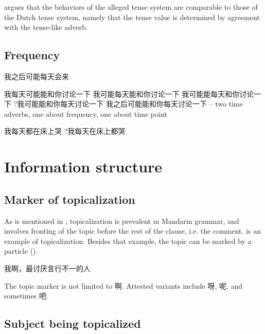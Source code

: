 \documentclass[UTF8, a4paper, oneside, scheme=plain, 12pt]{ctexrep}
\begin{document}
\citet{sybesma2007whether} argues that the behaviors of the alleged tense system
are comparable to those of the Dutch tense system,
namely that the tense value is determined by agreement with the tense-like adverb.

\section{Frequency}

\begin{exe}
    \ex 我之后可能每天会来 

    \ex *我每天可能能和你讨论一下
    \ex 我可能每天能和你讨论一下 
    \ex 我可能能每天和你讨论一下 
    \ex ?我可能能和你每天讨论一下
    \ex 我之后可能能和你每天讨论一下 -- two time adverbs, one about frequency, one about time point 
\end{exe}

\begin{exe}
    \ex 我每天都在床上哭
    \ex ?我每天在床上都哭
\end{exe}

\chapter{Information structure}

\section{Marker of topicalization}


As is mentioned in ,
topicalization is prevalent in Mandarin grammar,
and involves fronting of the topic before the rest of the clause, i.e. the comment.
 is an example of topicalization.
Besides that example, the topic can be marked by a particle
().

\begin{exe}
    \ex\label{ex:information.topic.marker.1} 我啊，最讨厌言行不一的人
\end{exe}

The topic marker is not limited to 啊.
Attested variants include 呀, 呢, and sometimes 吧.

\section{Subject being topicalized}\label{sec:topic.subject}
\end{document}
